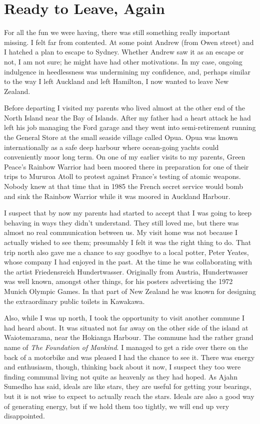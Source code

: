 \chapter{Ready to Leave, Again}

For all the fun we were having, there was still something really
important missing. I felt far from contented. At some point Andrew (from
Owen street) and I hatched a plan to escape to Sydney. Whether Andrew
saw it as an escape or not, I am not sure; he might have had other
motivations. In my case, ongoing indulgence in heedlessness was
undermining my confidence, and, perhaps similar to the way I left
Auckland and left Hamilton, I now wanted to leave New Zealand.

Before departing I visited my parents who lived almost at the other end
of the North Island near the Bay of Islands. After my father had a heart
attack he had left his job managing the Ford garage and they went into
semi-retirement running the General Store at the small seaside village
called Opua. Opua was known internationally as a safe deep harbour where
ocean-going yachts could conveniently moor long term. On one of my
earlier visits to my parents, Green Peace's Rainbow Warrior had been
moored there in preparation for one of their trips to Mururoa Atoll to
protest against France's testing of atomic weapons. Nobody knew at that
time that in 1985 the French secret service would bomb and sink the
Rainbow Warrior\cite{rainbow} while it was moored in Auckland Harbour.

I suspect that by now my parents had started to accept that I was going
to keep behaving in ways they didn't understand. They still loved me,
but there was almost no real communication between us. My visit home was
not because I actually wished to see them; presumably I felt it was the
right thing to do. That trip north also gave me a chance to say goodbye
to a local potter, Peter Yeates, whose company I had enjoyed in the
past. At the time he was collaborating with the artist Friedensreich
Hundertwasser. Originally from Austria, Hundertwasser was well known,
amongst other things, for his posters advertising the
1972 Munich Olympic Games\cite{olympic}.
In that part of New Zealand he was known for designing the extraordinary
public toilets in Kawakawa\cite{toilets}.

Also, while I was up north, I took the opportunity to visit another
commune I had heard about. It was situated not far away on the other
side of the island at Waiotemarama, near the Hokianga Harbour. The
commune had the rather grand name of \emph{The Foundation of Mankind}. I
managed to get a ride over there on the back of a motorbike and was
pleased I had the chance to see it. There was energy and enthusiasm,
though, thinking back about it now, I suspect they too were finding
communal living not quite as heavenly as they had hoped. As Ajahn
Sumedho has said, ideals are like stars, they are useful for getting
your bearings, but it is not wise to expect to actually reach the stars.
Ideals are also a good way of generating energy, but if we hold them too
tightly, we will end up very disappointed.

